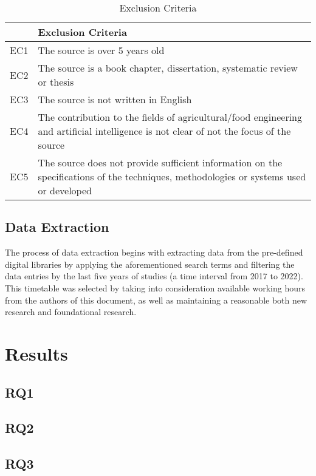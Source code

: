 \documentclass[conference]{IEEEtran}
\begin{document}
\begin{table*}
	\caption{Exclusion Criteria}
	\label{tab:exccrit}

	\begin{tabular}{ll}
	\hline
		 & Exclusion Criteria \\
	\hline
		EC1 & The source is over 5 years old \\
		EC2 & The source is a book chapter, dissertation, systematic review or thesis \\
		EC3 & The source is not written in English \\
		EC4 & The contribution to the fields of agricultural/food engineering and artificial intelligence is not clear of not the focus of the source \\
		EC5 & The source does not provide sufficient information on the specifications of the techniques, methodologies or systems used or developed \\
	\hline
	\end{tabular}
\end{table*}

\subsection{Data Extraction}

The process of data extraction begins with extracting data from the pre-defined digital libraries by applying the aforementioned search terms and filtering the data entries by the last five years of studies (a time interval from 2017 to 2022). This timetable was selected by taking into consideration available working hours from the authors of this document, as well as maintaining a reasonable both new research and foundational research. 

\section{Results}
\label{sec:res}

\subsection{RQ1}
\subsection{RQ2}
\subsection{RQ3}
\end{document}
